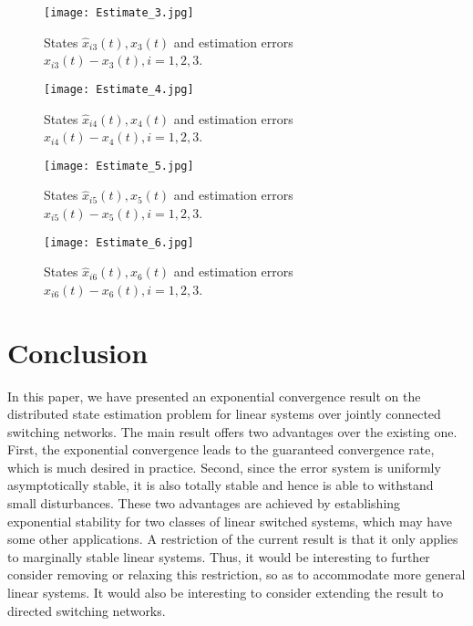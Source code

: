 \documentclass[twocolumn]{autart}
\begin{document}
\begin{figure}
\centering
  \texttt{[image: Estimate\_3.jpg]}\\
  \caption{States $\hat{x}_{i3}(t), x_{3}(t)$ and estimation errors $\hat{x}_{i3}(t)-x_{3}(t),i=1,2,3$.}\label{Fig-Estimate_3}
\end{figure}



\begin{figure}
\centering
  \texttt{[image: Estimate\_4.jpg]}\\
  \caption{States $\hat{x}_{i4}(t), x_{4}(t)$ and estimation errors $\hat{x}_{i4}(t)-x_{4}(t),i=1,2,3$.}\label{Fig-Estimate_4}
\end{figure}


\begin{figure}
\centering
  \texttt{[image: Estimate\_5.jpg]}\\
  \caption{States $\hat{x}_{i5}(t), x_{5}(t)$ and estimation errors $\hat{x}_{i5}(t)-x_{5}(t),i=1,2,3$.}\label{Fig-Estimate_5}
\end{figure}



\begin{figure}
\centering
  \texttt{[image: Estimate\_6.jpg]}\\
  \caption{States $\hat{x}_{i6}(t), x_{6}(t)$ and  estimation errors $\hat{x}_{i6}(t)-x_{6}(t),i=1,2,3$.}\label{Fig-Estimate_6}
\end{figure}








\section{Conclusion}\label{Section-Conclusion}
In this paper, we have presented an exponential convergence result on the distributed state estimation problem for linear systems over jointly connected switching networks.
The main result
offers two advantages over the existing one.
First, the exponential convergence leads to the guaranteed convergence rate, which is much  desired in practice.
Second, since the error system is uniformly asymptotically stable,
it is also totally stable and hence is able to withstand small disturbances.
These two advantages are achieved by establishing exponential stability for two classes of linear switched systems,
which may have some other applications.
A restriction of the current result is that it only applies to marginally stable linear systems.
Thus, it would be interesting to further consider removing or relaxing this restriction,
so as to accommodate more general linear systems.
It would also be interesting to consider extending the result to directed switching networks.
\end{document}
